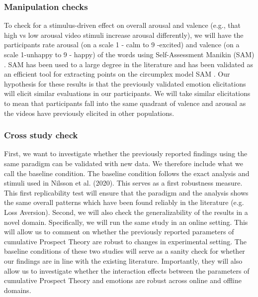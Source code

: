\documentclass{article}
\begin{document}
    \subsubsection{Manipulation checks}
    To check for a stimulus-driven effect on overall arousal and valence (e.g., that high vs low arousal video stimuli increase arousal differently), we will have the participants rate arousal (on a scale 1 - calm to 9 -excited) and valence (on a scale 1-unhappy to 9 - happy) of the words using Self-Assessment Manikin (SAM) \cite{bradley1994measuring}. SAM has been used to a large degree in the literature and has been validated as an efficient tool for extracting points on the circumplex model SAM \cite{bradley1994measuring}. Our hypothesis for these results is that the previously validated emotion elicitations will elicit similar evaluations in our participants. We will take similar elicitations to mean that participants fall into the same quadrant of valence and arousal as the videos have previously elicited in other populations. 
    \subsubsection{Cross study check}
    First, we want to investigate whether the previously reported findings using the same paradigm can be validated with new data. We therefore include what we call the baseline condition. The baseline condition follows the exact analysis and stimuli used in Nilsson et al. (2020). This serves as a first robustness measure. This first replicability test will ensure that the paradigm and the analysis shows the same overall patterns which have been found reliably in the literature (e.g. Loss Aversion). 
Second, we will also check the generalizability of the results in a novel domain. Specifically, we will run the same study in an online setting. This will allow us to comment on whether the previously reported parameters of cumulative Prospect Theory are robust to changes in experimental setting. 
The baseline conditions of these two studies will serve as a sanity check for whether our findings are in line with the existing literature. Importantly, they will also allow us to investigate whether the interaction effects between the parameters of cumulative Prospect Theory and emotions are robust across online and offline domains. 
\end{document}
